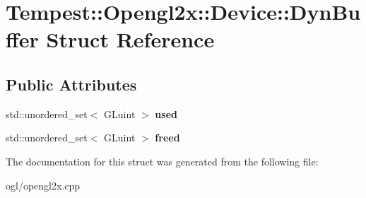 \hypertarget{struct_tempest_1_1_opengl2x_1_1_device_1_1_dyn_buffer}{\section{Tempest\+:\+:Opengl2x\+:\+:Device\+:\+:Dyn\+Buffer Struct Reference}
\label{struct_tempest_1_1_opengl2x_1_1_device_1_1_dyn_buffer}
}
\subsection*{Public Attributes}
\begin{DoxyCompactItemize}
\item 
\hypertarget{struct_tempest_1_1_opengl2x_1_1_device_1_1_dyn_buffer_a24509d20ab8b61f1318e0d8997f7acd9}{std\+::unordered\+\_\+set$<$ G\+Luint $>$ {\bfseries used}}\label{struct_tempest_1_1_opengl2x_1_1_device_1_1_dyn_buffer_a24509d20ab8b61f1318e0d8997f7acd9}

\item 
\hypertarget{struct_tempest_1_1_opengl2x_1_1_device_1_1_dyn_buffer_a5148cbdab27019480a8679baf8452927}{std\+::unordered\+\_\+set$<$ G\+Luint $>$ {\bfseries freed}}\label{struct_tempest_1_1_opengl2x_1_1_device_1_1_dyn_buffer_a5148cbdab27019480a8679baf8452927}

\end{DoxyCompactItemize}


The documentation for this struct was generated from the following file\+:\begin{DoxyCompactItemize}
\item 
ogl/opengl2x.\+cpp\end{DoxyCompactItemize}
